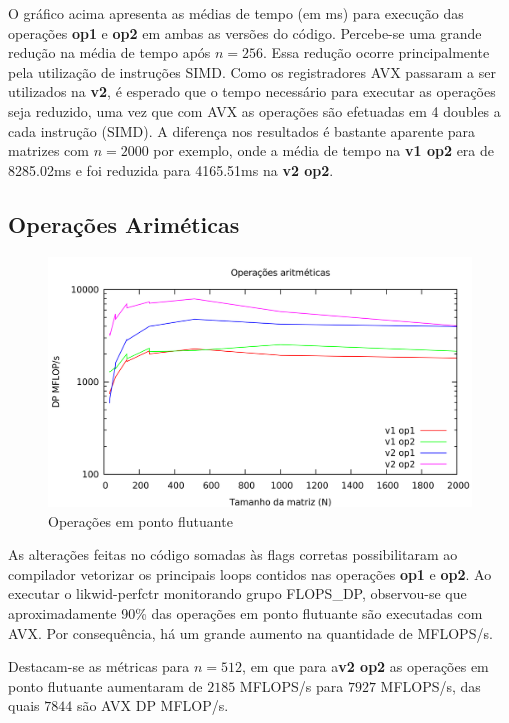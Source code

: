 \documentclass[12pt]{article}
\begin{document}
O gráfico acima apresenta as médias de tempo (em ms) para execução das operações \textbf{op1} e \textbf{op2} em ambas as versões do código. Percebe-se uma grande redução na média de tempo após $n = 256$. Essa redução ocorre principalmente pela utilização de instruções SIMD. Como os registradores AVX passaram a ser utilizados na \textbf{v2}, é esperado que o tempo necessário para executar as operações seja reduzido, uma vez que com AVX as operações são efetuadas em 4 doubles a cada instrução (SIMD). A diferença nos resultados é bastante aparente para matrizes com $n = 2000$ por exemplo, onde a média de tempo na \textbf{v1 op2} era de 8285.02ms e foi reduzida para 4165.51ms na \textbf{v2 op2}.

\subsection{Operações Ariméticas}

\begin{figure}[H]
\centering
\includegraphics[width=1\textwidth]{img/flops-scalar.png}
\caption{Operações em ponto flutuante}
\end{figure}

As alterações feitas no código somadas às flags corretas possibilitaram ao compilador vetorizar os principais loops contidos nas operações \textbf{op1} e \textbf{op2}. Ao executar o likwid-perfctr monitorando grupo FLOPS\_DP, observou-se que aproximadamente 90\% das operações em ponto flutuante são executadas com AVX. Por consequência, há um grande aumento na quantidade de MFLOPS/s.

Destacam-se as métricas para $n = 512$, em que para a\textbf{v2 op2} as operações em ponto flutuante aumentaram de $2185$ MFLOPS/s para  $7927$ MFLOPS/s, das quais $7844$ são AVX DP MFLOP/s.
\end{document}
